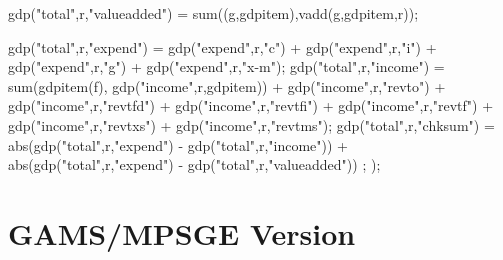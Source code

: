 \begin{GAMSCode*}
        gdp("total",r,"valueadded") = sum((g,gdpitem),vadd(g,gdpitem,r));

        gdp("total",r,"expend") =
                        gdp("expend",r,"c")
                        + gdp("expend",r,"i")
                        + gdp("expend",r,"g")
                        + gdp("expend",r,"x-m");
        gdp("total",r,"income") =
                        sum(gdpitem(f), gdp("income",r,gdpitem))
                        + gdp("income",r,"revto")
                        + gdp("income",r,"revtfd")
                        + gdp("income",r,"revtfi")
                        + gdp("income",r,"revtf")
                        + gdp("income",r,"revtxs")
                        + gdp("income",r,"revtms");
        gdp("total",r,"chksum") = abs(gdp("total",r,"expend") - gdp("total",r,"income")) +
                                  abs(gdp("total",r,"expend") - gdp("total",r,"valueadded")) ;
);

\end{GAMSCode*}

\clearpage

\section*{GAMS/MPSGE Version}

